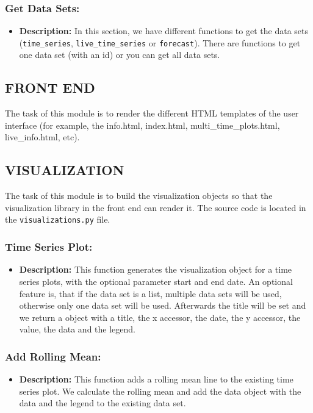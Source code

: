\documentclass[11pt, a4paper]{article}
\begin{document}
\subsubsection*{Get Data Sets:}
\begin{itemize}
 \item[] \textbf{Description:} In this section, we have different functions to get the data sets (\texttt{time\_series}, \texttt{live\_time\_series} or \texttt{forecast}). 
 There are functions to get one data set (with an id) or you can get all data sets.
\end{itemize}


\subsection{FRONT END}
The task of this module is to render the different HTML templates of the user interface (for example, the info.html, index.html, multi\_time\_plots.html, live\_info.html, etc).


\subsection{VISUALIZATION}
The task of this module is to build the visualization objects so that the visualization library in the front end can render it.
The source code is located in the \texttt{visualizations.py} file.


\subsubsection*{Time Series Plot:}
\begin{itemize}
 \item[] \textbf{Description:} This function generates the visualization object for a time series plots, with the optional parameter start and end date.
An optional feature is, that if the data set is a list, multiple data sets will be used, otherwise only one data set will be used.
Afterwards the title will be set and we return a object with a title, the x accessor, the date, the y accessor, the value,
the data and the legend.
\end{itemize}


\subsubsection*{Add Rolling Mean:}
\begin{itemize}
 \item[] \textbf{Description:} This function adds a rolling mean line to the existing time series plot. 
 We calculate the rolling mean and add the data object with the data and the legend to the existing data set.
\end{itemize}
\end{document}
